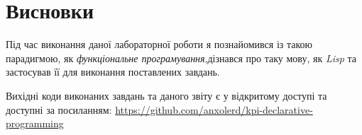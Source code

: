 \documentclass[a4paper, 12pt]{extarticle}
\begin{document}
\section{Висновки}

Під час виконання даної лабораторної роботи я познайомився із такою парадигмою, як \textit{функціональне програмування},дізнався про таку мову, як \textit{Lisp} та застосував її для виконання поставлених завдань.

Вихідні коди виконаних завдань та даного звіту є у відкритому доступі та доступні за посиланням: \url{https://github.com/anxolerd/kpi-declarative-programming}
\end{document}
